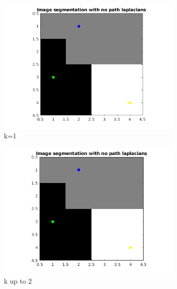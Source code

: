 \documentclass[10pt,a4paper]{article}
\begin{document}
\begin{figure}[H]
	\centering
	\begin{subfigure}[b]{0.45\textwidth}
		\includegraphics[width=\textwidth]{segmentation-images/4by4longrange1-s4.png}
		\caption{k=1}
	\end{subfigure}
	\begin{subfigure}[b]{0.45\textwidth}
		\includegraphics[width=\textwidth]{segmentation-images/4by4longrange2-s2.png}
		\caption{k up to 2}
	\end{subfigure} \\
    \begin{subfigure}[b]{0.45\textwidth}

\end{subfigure}
\end{figure}
\end{document}
